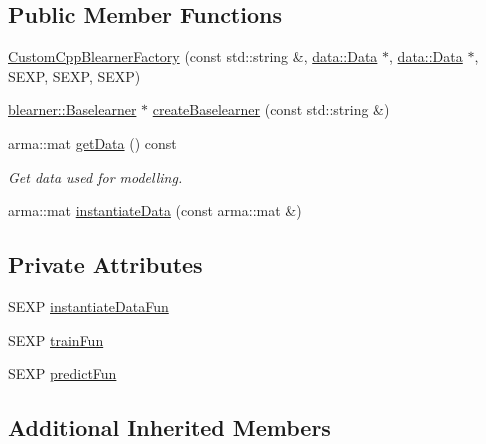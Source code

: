 \subsection*{Public Member Functions}
\begin{DoxyCompactItemize}
\item 
\hyperlink{classblearnerfactory_1_1_custom_cpp_blearner_factory_a390de0fb001434b3252e5f723c55d7b3}{Custom\+Cpp\+Blearner\+Factory} (const std\+::string \&, \hyperlink{classdata_1_1_data}{data\+::\+Data} $\ast$, \hyperlink{classdata_1_1_data}{data\+::\+Data} $\ast$, S\+E\+XP, S\+E\+XP, S\+E\+XP)
\item 
\hyperlink{classblearner_1_1_baselearner}{blearner\+::\+Baselearner} $\ast$ \hyperlink{classblearnerfactory_1_1_custom_cpp_blearner_factory_ac98fae043e6822605261c7c6f7125e8c}{create\+Baselearner} (const std\+::string \&)
\item 
arma\+::mat \hyperlink{classblearnerfactory_1_1_custom_cpp_blearner_factory_a29cc0d142660d6e52245c264f71dd651}{get\+Data} () const
\begin{DoxyCompactList}\small\item\em Get data used for modelling. \end{DoxyCompactList}\item 
arma\+::mat \hyperlink{classblearnerfactory_1_1_custom_cpp_blearner_factory_abc9c251017197087af3ef8a1c0421969}{instantiate\+Data} (const arma\+::mat \&)
\end{DoxyCompactItemize}
\subsection*{Private Attributes}
\begin{DoxyCompactItemize}
\item 
S\+E\+XP \hyperlink{classblearnerfactory_1_1_custom_cpp_blearner_factory_aa9264dd28d1046cef3d38d531e065bc0}{instantiate\+Data\+Fun}
\item 
S\+E\+XP \hyperlink{classblearnerfactory_1_1_custom_cpp_blearner_factory_aad89a4d126b8b3e5ac0b6bca98074193}{train\+Fun}
\item 
S\+E\+XP \hyperlink{classblearnerfactory_1_1_custom_cpp_blearner_factory_aa17d2f6ba9b64a6908548b017242d24e}{predict\+Fun}
\end{DoxyCompactItemize}
\subsection*{Additional Inherited Members}


